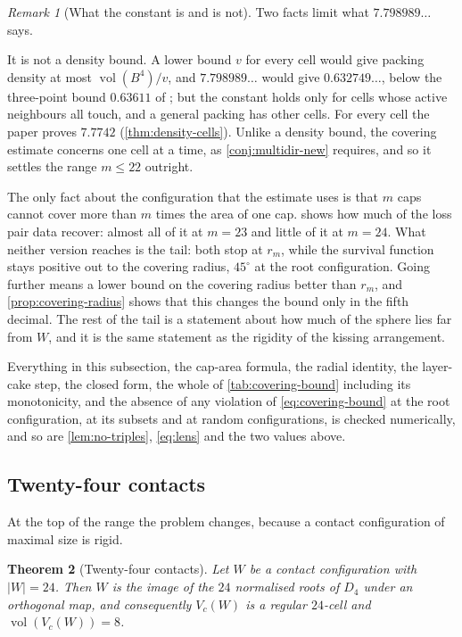 \documentclass[11pt,reqno]{amsart}
\renewcommand{\_}{\origunderscore\allowbreak}
\numberwithin{equation}{section}
\theoremstyle{plain}
\newtheorem{thm}{Theorem}[section]
\theoremstyle{definition}
\theoremstyle{remark}
\newtheorem{remark}[thm]{Remark}
\DeclareMathOperator{\vol}{vol}
\begin{document}
\begin{remark}[What the constant is and is not]\label{rem:covering-scope}
Two facts limit what $7.798989\ldots$ says.

It is not a density bound. A lower bound $v$ for every cell would give
packing density at most $\vol(B^4)/v$, and $7.798989\ldots$ would give
$0.632749\ldots$, below the three-point bound $0.63611$ of \cite{CdLS22};
but the constant holds only for cells whose active neighbours all touch,
and a general packing has other cells. For every cell the paper proves
$7.7742$ (\cref{thm:density-cells}).
Unlike a density bound, the covering estimate concerns one cell at a
time, as \cref{conj:multidir-new} requires, and so it settles the range
$m\le22$ outright.

The only fact about the configuration that the estimate uses is that
$m$ caps cannot cover more than $m$ times the area of one cap.
 shows how much of the loss pair data recover:
almost all of it at $m=23$ and little of it at $m=24$. What
neither version reaches is the tail: both stop at $r_m$, while the
survival function stays positive out to the covering radius, $45^\circ$
at the root configuration. Going further means a lower bound on the
covering radius better than $r_m$, and \cref{prop:covering-radius} shows
that this changes the bound only in the fifth decimal. The rest of the tail is
a statement about how much of the sphere lies far from $W$, and it is
the same statement as the rigidity of the kissing arrangement.

Everything in this subsection, the cap-area formula, the radial
identity, the layer-cake step, the closed form, the whole of
\cref{tab:covering-bound} including its monotonicity, and the absence of
any violation of \eqref{eq:covering-bound} at the root configuration, at
its subsets and at random configurations, is checked numerically, and so
are \cref{lem:no-triples}, \eqref{eq:lens} and the two values above.
\end{remark}

\subsection{Twenty-four contacts}\label{sec:m24}

At the top of the range the problem changes, because a contact
configuration of maximal size is rigid.

\begin{thm}[Twenty-four contacts]\label{thm:m24}
Let $W$ be a contact configuration with $|W|=24$. Then $W$ is the image
of the $24$ normalised roots of $D_4$ under an orthogonal map, and
consequently $V_c(W)$ is a regular $24$-cell and $\vol(V_c(W))=8$.
\end{thm}
\end{document}
